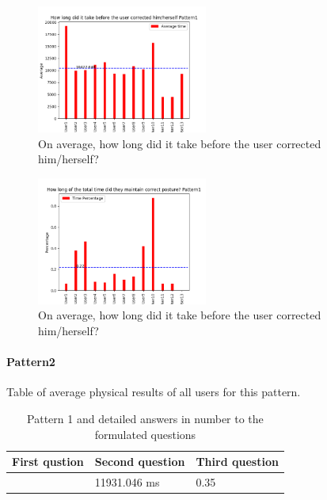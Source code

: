 \documentclass[sigconf]{acmart}
\begin{document}
\begin{figure}[h]
\centering
\includegraphics[width=0.5\textwidth, scale=1]{p1_q2.png}
\caption{On average, how long did it take before the user corrected him/herself?}
\end{figure}

\begin{figure}[h]
\centering
\includegraphics[width=0.5\textwidth, scale=1]{p1_q3.png}
\caption{On average, how long did it take before the user corrected him/herself?}
\end{figure}




\paragraph {Pattern2}
Table of average physical results of all users for this pattern.\\

\begin{table}[htb]
\caption{Pattern 1 and detailed answers in number to the formulated questions}
\label{my-label}
\begin{tabular}{|l|l|l|}
\hline
\multicolumn{1}{|c|}{\textbf{First qustion}} & \multicolumn{1}{c|}{\textbf{Second question}} & \multicolumn{1}{c|}{\textbf{Third question}} \\ \hline
 [24.0, 26.0, 22.0]& 11931.046 ms & 0.35%
\end{tabular}
\end{table}
\end{document}

